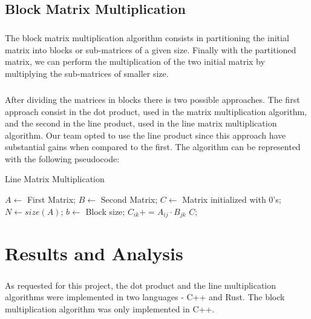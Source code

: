 \documentclass{report}
\begin{document}
		\section{Block Matrix Multiplication}
		
		\paragraph{} The block matrix multiplication algorithm consists in partitioning the initial matrix into blocks or sub-matrices of a given size. Finally with the partitioned matrix, we can perform the multiplication of the two initial matrix by multiplying the sub-matrices of smaller size.
		
		\paragraph{} After dividing the matrices in blocks there is two possible approaches. The first approach consist in the dot product, used in the matrix multiplication algorithm, and the second in the line product, used in the line matrix multiplication algorithm. Our team opted to use the line product since this approach have substantial gains when compared to the first. The algorithm can be represented with the following pseudocode:
		
		\begin{algorithm}[H]
			\caption{Line Matrix Multiplication} 
			\begin{algorithmic}[1]
				\State$A\gets $ First Matrix; $B\gets $ Second Matrix;
				\State$C\gets $ Matrix initialized with 0's;
				\State$N\gets size(A)$;
				\State$b\gets $ Block size;
										\State $C_{ik} += A_{ij} \cdot B_{jk}$
									\EndFor
								\EndFor
							\EndFor
						\EndFor
					\EndFor
				\EndFor
				\State\Return $C$;
			\end{algorithmic} 
		\end{algorithm}
	
	\chapter{Results and Analysis}
	
		\paragraph{}As requested for this project, the dot product and the line multiplication algorithms were implemented in two languages - C++ and Rust. The block multiplication algorithm was only implemented in C++.
		
\end{document}
